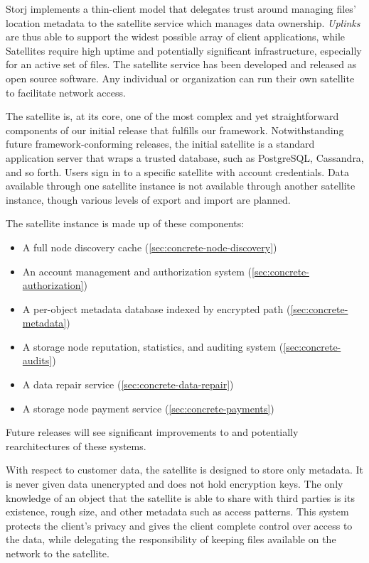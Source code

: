 \documentclass[11pt,fleqn,openany]{book}
\begin{document}
Storj implements a thin-client model that delegates trust around managing
files' location metadata to the satellite service which manages data
ownership. {\em Uplinks}
are thus able to support the widest possible array of client applications, while
Satellites require high uptime and potentially significant infrastructure,
especially for an active set of files.
The satellite service has been developed and released as open source software.
Any individual or organization can run their own satellite to facilitate
network access.

The satellite is, at its core, one of the most complex and yet
straightforward components of our initial release that fulfills our framework.
Notwithstanding future framework-conforming releases, the initial satellite
is a standard application server that wraps a trusted database, such as
PostgreSQL, Cassandra, and so forth. Users sign in to a specific
satellite with account credentials.
Data available through one satellite instance is
not available through another satellite instance, though various levels of
export and import are planned.

The satellite instance is made up of these components:
\begin{itemize}
\item A full node discovery cache (\ref{sec:concrete-node-discovery})
\item An account management and authorization system
  (\ref{sec:concrete-authorization})
\item A per-object metadata database indexed by encrypted path
  (\ref{sec:concrete-metadata})
\item A storage node reputation, statistics, and auditing system
  (\ref{sec:concrete-audits})
\item A data repair service (\ref{sec:concrete-data-repair})
\item A storage node payment service (\ref{sec:concrete-payments})
\end{itemize}

Future releases will see significant improvements to and potentially
rearchitectures of these systems.

With respect to customer data, the satellite is designed to store only
metadata. It is never given data unencrypted and does not hold encryption keys.
The only knowledge of an object that the satellite is able to share with
third parties is its existence, rough size, and other metadata such as access
patterns.
This system protects the client's privacy and gives the client complete
control over access to the data,
while delegating the responsibility of keeping files available on the network
to the satellite.
\end{document}
